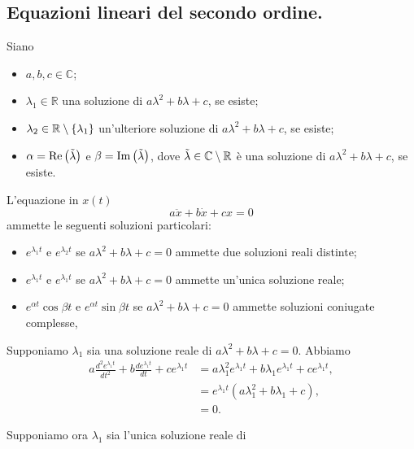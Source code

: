 \subsection{Equazioni lineari del secondo ordine.}
\label{EquazioniDifferenziali_EquazioniLineariDelSecondoOrdine}
\begin{Theorem}
  Siano
  \begin{itemize}
    \item $a, b, c \in \mathbb{C}$;
    \item $\lambda_1 \in \mathbb{R}$ una soluzione di
        $a\lambda^2 + b\lambda + c$, se esiste;
    \item $\lambda_2 \in \mathbb{R} \setminus \lbrace \lambda_1 \rbrace$
        un'ulteriore soluzione di $a\lambda^2 + b\lambda + c$, se esiste;
    \item $\alpha = \text{Re} \left ( \tilde{\lambda} \right )$ e
        $\beta = \text{Im} \left ( \tilde{\lambda} \right )$, dove
        $\tilde{\lambda} \in \mathbb{C} \setminus \mathbb{R}$
        \`e una soluzione di
        $a\lambda^2 + b\lambda + c$, se esiste.
  \end{itemize}
  L'equazione in $x(t)$
  \[
    a\ddot{x} + b\dot{x} + cx = 0
  \]
  ammette le seguenti soluzioni particolari:
  \begin{itemize}
    \item $e^{\lambda_1 t}$ e $e^{\lambda_2 t}$
      se $a\lambda^2 + b\lambda + c = 0$
      ammette due soluzioni reali distinte;
    \item $e^{\lambda_1 t}$ e $e^{\lambda_1 t}$
      se $a\lambda^2 + b\lambda + c = 0$
      ammette un'unica soluzione reale;
    \item $e^{\alpha t}\cos \beta t$ e
      $e^{\alpha t}\sin \beta t$
      se $a\lambda^2 + b\lambda + c = 0$
      ammette soluzioni coniugate complesse,
  \end{itemize}
\end{Theorem}
\Proof Supponiamo $\lambda_1$ sia una soluzione reale di
$a\lambda^2 + b\lambda + c = 0$. Abbiamo
\begin{align*}
  a \frac{d^2 e^{\lambda_1 t}}{dt^2}
  + b \frac{d e^{\lambda_1 t}}{dt}
  + c e^{\lambda_1 t}
  &= a \lambda_1^2 e^{\lambda_1 t}
  + b \lambda_1 e^{\lambda_1 t}
  + c e^{\lambda_1 t},\\
  &= e^{\lambda_1 t} (a \lambda_1^2 + b \lambda_1 + c),\\
  &= 0.
\end{align*}
\par Supponiamo ora $\lambda_1$ sia l'unica soluzione reale di

